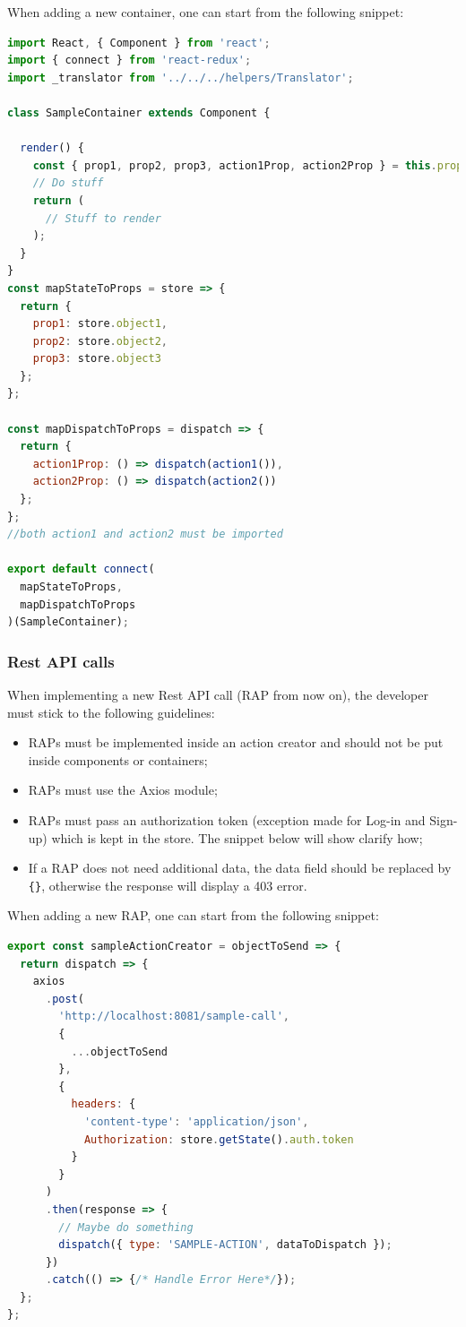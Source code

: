When adding a new container, one can start from the following snippet:
\begin{lstlisting}[language=JavaScript, frame=single]
import React, { Component } from 'react';
import { connect } from 'react-redux';
import _translator from '../../../helpers/Translator';

class SampleContainer extends Component {

  render() {
    const { prop1, prop2, prop3, action1Prop, action2Prop } = this.props;
    // Do stuff
    return (
      // Stuff to render
    );
  }
}
const mapStateToProps = store => {
  return {
    prop1: store.object1,
    prop2: store.object2,
    prop3: store.object3
  };
};

const mapDispatchToProps = dispatch => {
  return {
    action1Prop: () => dispatch(action1()),
    action2Prop: () => dispatch(action2())
  };
};
//both action1 and action2 must be imported

export default connect(
  mapStateToProps,
  mapDispatchToProps
)(SampleContainer);
\end{lstlisting}


\subsubsection{Rest API calls}
When implementing a new Rest API call (RAP from now on), the developer must stick to the following guidelines:
\begin{itemize}
	\item RAPs must be implemented inside an action creator and should not be put inside components or containers;
	\item RAPs must use the Axios module;
	\item RAPs must pass an authorization token (exception made for Log-in and Sign-up) which is kept in the store. The snippet below will show clarify how;
	\item If a RAP does not need additional data, the data field should be replaced by \texttt{\{\}}, otherwise the response will display a 403 error.
\end{itemize}
When adding a new RAP, one can start from the following snippet:
\begin{lstlisting}[language=JavaScript, frame=single]
export const sampleActionCreator = objectToSend => {
  return dispatch => {
    axios
      .post(
        'http://localhost:8081/sample-call',
        {
          ...objectToSend
        },
        {
          headers: {
            'content-type': 'application/json',
            Authorization: store.getState().auth.token
          }
        }
      )
      .then(response => {
        // Maybe do something
        dispatch({ type: 'SAMPLE-ACTION', dataToDispatch });
      })
      .catch(() => {/* Handle Error Here*/});
  };
};
\end{lstlisting}


